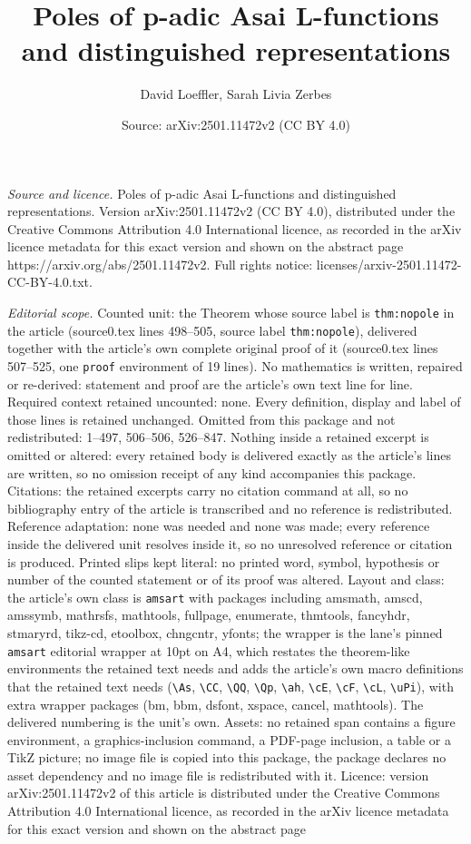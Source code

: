 \documentclass[10pt,a4paper]{amsart}
\title[Poles of p-adic Asai L-functions and distinguished represent]{Poles of p-adic Asai L-functions and distinguished representations}
\author{David Loeffler, Sarah Livia Zerbes}
\date{Source: arXiv:2501.11472v2 (CC BY 4.0)}
\begin{document}
\maketitle

\noindent\emph{Source and licence.} Poles of p-adic Asai L-functions and distinguished representations. Version arXiv:2501.11472v2 (CC BY 4.0), distributed under the Creative Commons Attribution 4.0 International licence, as recorded in the arXiv licence metadata for this exact version and shown on the abstract page https://arxiv.org/abs/2501.11472v2. Full rights notice: licenses/arxiv-2501.11472-CC-BY-4.0.txt.\par\smallskip

\noindent\textit{Editorial scope.} Counted unit: the Theorem whose source label is \texttt{thm:nopole} in the article (source0.tex lines 498--505, source label \texttt{thm:nopole}), delivered together with the article's own complete original proof of it (source0.tex lines 507--525, one \texttt{proof} environment of 19 lines). No mathematics is written, repaired or re-derived: statement and proof are the article's own text line for line. Required context retained uncounted: none. Every definition, display and label of those lines is retained unchanged. Omitted from this package and not redistributed: 1--497, 506--506, 526--847. Nothing inside a retained excerpt is omitted or altered: every retained body is delivered exactly as the article's lines are written, so no omission receipt of any kind accompanies this package. Citations: the retained excerpts carry no citation command at all, so no bibliography entry of the article is transcribed and no reference is redistributed. Reference adaptation: none was needed and none was made; every reference inside the delivered unit resolves inside it, so no unresolved reference or citation is produced. Printed slips kept literal: no printed word, symbol, hypothesis or number of the counted statement or of its proof was altered. Layout and class: the article's own class is \texttt{amsart} with packages including amsmath, amscd, amssymb, mathrsfs, mathtools, fullpage, enumerate, thmtools, fancyhdr, stmaryrd, tikz-cd, etoolbox, chngcntr, yfonts; the wrapper is the lane's pinned \texttt{amsart} editorial wrapper at 10pt on A4, which restates the theorem-like environments the retained text needs and adds the article's own macro definitions that the retained text needs (\texttt{\textbackslash As}, \texttt{\textbackslash CC}, \texttt{\textbackslash QQ}, \texttt{\textbackslash Qp}, \texttt{\textbackslash ah}, \texttt{\textbackslash cE}, \texttt{\textbackslash cF}, \texttt{\textbackslash cL}, \texttt{\textbackslash uPi}), with extra wrapper packages (bm, bbm, dsfont, xspace, cancel, mathtools). The delivered numbering is the unit's own. Assets: no retained span contains a figure environment, a graphics-inclusion command, a PDF-page inclusion, a table or a TikZ picture; no image file is copied into this package, the package declares no asset dependency and no image file is redistributed with it. Licence: version arXiv:2501.11472v2 of this article is distributed under the Creative Commons Attribution 4.0 International licence, as recorded in the arXiv licence metadata for this exact version and shown on the abstract page 
\end{document}

